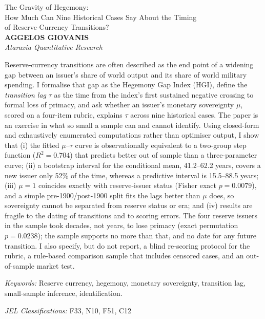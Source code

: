 \documentclass[11pt,letterpaper]{article}
\theoremstyle{definition}
\theoremstyle{plain}
\begin{document}
\thispagestyle{plain}
\begin{center}
{\LARGE The Gravity of Hegemony:\\[3pt]
How Much Can Nine Historical Cases Say About the Timing\\[3pt]
of Reserve-Currency Transitions?}\\[22pt]
{\large\bfseries AGGELOS GIOVANIS}\\[3pt]
{\itshape\large Ataraxia Quantitative Research}\\[16pt]
\end{center}

\begin{center}
\begin{minipage}{0.9\textwidth}
\small\noindent
Reserve-currency transitions are often described as the end point of a widening gap between an issuer's share of world output and its share of world military spending. I formalise that gap as the Hegemony Gap Index (HGI), define the \emph{transition lag} $\tau$ as the time from the index's first sustained negative crossing to formal loss of primacy, and ask whether an issuer's monetary sovereignty $\mu$, scored on a four-item rubric, explains $\tau$ across nine historical cases. The paper is an exercise in what so small a sample can and cannot identify. Using closed-form and exhaustively enumerated computations rather than optimiser output, I show that (i) the fitted $\mu$--$\tau$ curve is observationally equivalent to a two-group step function ($R^2=0.704$) that predicts better out of sample than a three-parameter curve; (ii) a bootstrap interval for the conditional mean, 41.2--62.2 years, covers a new issuer only 52\% of the time, whereas a predictive interval is 15.5--88.5 years; (iii) $\mu=1$ coincides exactly with reserve-issuer status (Fisher exact $p=0.0079$), and a simple pre-1900/post-1900 split fits the lags better than $\mu$ does, so sovereignty cannot be separated from reserve status or era; and (iv) results are fragile to the dating of transitions and to scoring errors. The four reserve issuers in the sample took decades, not years, to lose primacy (exact permutation $p=0.0238$); the sample supports no more than that, and no date for any future transition. I also specify, but do not report, a blind re-scoring protocol for the rubric, a rule-based comparison sample that includes censored cases, and an out-of-sample market test.

\medskip
\noindent\textit{Keywords:} Reserve currency, hegemony, monetary sovereignty, transition lag, small-sample inference, identification.

\medskip
\noindent\textit{JEL Classifications:} F33, N10, F51, C12
\end{minipage}
\end{center}
\bigskip
\end{document}
